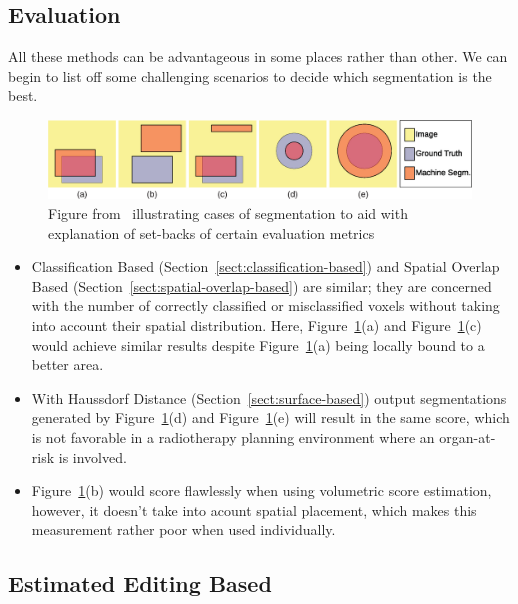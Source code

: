 \documentclass[12pt,twoside]{report}
\begin{document}
\subsection{Evaluation}\label{sect:evaluation-of-evaluation-methods}

All these methods can be advantageous in some places rather than other. We can begin to list off some challenging scenarios to decide which segmentation is the best.

\begin{figure}[H]
  \centering
  \includegraphics[width=\linewidth]{../figures/segmentation-cases-1.png}
  \caption{Figure from~\cite{boundary-overlap-metrics} illustrating cases of segmentation to aid with explanation of set-backs of certain evaluation metrics}
 \label{fig:segmentation-cases-1}
\end{figure}

\begin{itemize}
  \item Classification Based (Section~\ref{sect:classification-based}) and Spatial Overlap Based (Section~\ref{sect:spatial-overlap-based}) are similar; they are concerned with the number of correctly classified or misclassified voxels without taking into account their spatial distribution. Here, Figure~\ref{fig:segmentation-cases-1}(a) and Figure~\ref{fig:segmentation-cases-1}(c) would achieve similar results despite Figure~\ref{fig:segmentation-cases-1}(a) being locally bound to a better area.
  \item With Haussdorf Distance (Section~\ref{sect:surface-based}) output segmentations generated by Figure~\ref{fig:segmentation-cases-1}(d) and Figure~\ref{fig:segmentation-cases-1}(e) will result in the same score, which is not favorable in a radiotherapy planning environment where an organ-at-risk is involved.
  \item Figure~\ref{fig:segmentation-cases-1}(b) would score flawlessly when using volumetric score estimation, however, it doesn't take into acount spatial placement, which makes this measurement rather poor when used individually.
\end{itemize}

\subsection{Estimated Editing Based}\label{sect:surface-dice}
\end{document}
